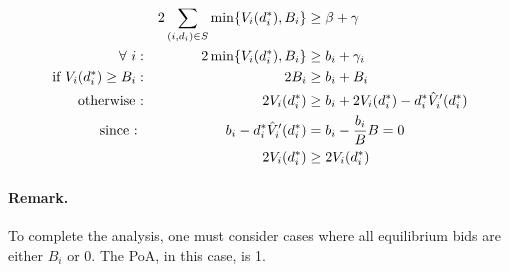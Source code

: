 \begin{align*}
	&& 2\sum_{(i,d_{i}) \in S} \min\{V_i(d_i^*), B_i \} &\ge \beta + \gamma\\
	\forall\ i : && 2 \min\{V_i(d_i^*), B_i \} &\ge b_i + \gamma_i \\
	\textnormal{if } V_i(d_i^*) \ge B_i : && 2B_i &\ge b_i + B_i\\
	\textnormal{otherwise :} && 2 V_i(d_i^*) &\ge b_i + 2 V_{i}(d^{*}_{i}) - d^{*}_{i} \hat{V}'_{i}(d^{*}_{i})\\
	\textnormal{since : } && b_i - d^{*}_{i} \hat{V}'_{i}(d^{*}_{i}) &= b_i - \frac{b_i}{B} B = 0\\
	&& 2 V_{i}(d^{*}_{i}) &\ge 2 V_{i}(d^{*}_{i})
\end{align*}

\paragraph{Remark.} To complete the analysis, one must consider cases where all equilibrium bids are either $B_{i}$ or 0. The PoA, in this case, is 1.
